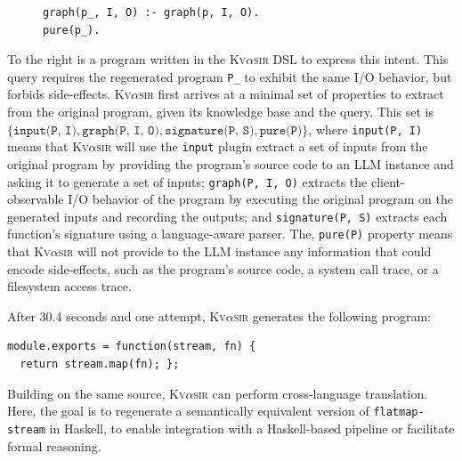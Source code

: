 \documentclass[nonacm,sigplan,review]{acmart}
\newcommand{\sys}{{\scshape Kv{$\alpha$}sir}\xspace}
\newcommand{\ttt}[1]{\texttt{#1}\xspace}
\begin{document}
\begin{figure}
\vspace{-10pt}
\hspace{-10pt}
\begin{verbatim}
graph(p_, I, O) :- graph(p, I, O).
pure(p_).
\end{verbatim}
\end{figure}
To the right is a program written in the \sys DSL to express this intent.
This query requires the regenerated program \ttt{P\_} to exhibit the same I/O behavior,
but forbids side-effects.
\sys first arrives at a minimal set of properties to extract from the
original program, given its knowledge base and the query.
This set is $\{\ttt{input(P, I)}, \ttt{graph(P, I, O)}, \ttt{signature(P, S)}, \ttt{pure(P)}\}$, where
\texttt{input(P, I)} means that \sys will use the \ttt{input} plugin extract a set of inputs from the original program
by providing the program's source code to an LLM instance and asking it to generate a set of inputs;
\texttt{graph(P, I, O)} extracts the client-observable I/O behavior of the program
by executing the original program on the generated inputs and recording the outputs;
and \texttt{signature(P, S)} extracts each function's signature using a language-aware parser.
The, \texttt{pure(P)} property means that \sys will not provide to the LLM 
instance any information that could encode side-effects, such as the
program's source code, a system call trace, or a filesystem access trace.

After 30.4 seconds and one attempt, \sys generates the following program:
\begin{verbatim}
module.exports = function(stream, fn) {
  return stream.map(fn); };
\end{verbatim}

Building on the same source, \sys can perform cross-language
translation. 
Here, the goal is to regenerate a semantically equivalent version
of \texttt{flatmap-stream} in Haskell, to enable integration with a
Haskell-based pipeline or facilitate formal reasoning.
\end{document}
